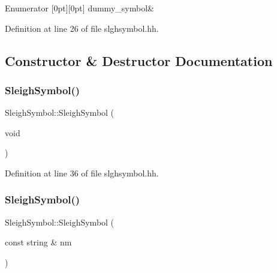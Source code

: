 \begin{DoxyEnumFields}{Enumerator}
[0pt][0pt]{}\mbox{\label{class_sleigh_symbol_aba70f7f332fd63488c5ec4bd7807db41acb07269e0bd99884c8507a618473896d}} 
dummy\+\_\+symbol&\\
\hline

\end{DoxyEnumFields}


Definition at line 26 of file slghsymbol.\+hh.



\subsection{Constructor \& Destructor Documentation}
\mbox{\label{class_sleigh_symbol_a15a720792ff4ad0940dd673c3215f037}} 
\subsubsection{\texorpdfstring{SleighSymbol()}{SleighSymbol()}\hspace{0.1cm}{\footnotesize\ttfamily [1/2]}}
{\footnotesize\ttfamily Sleigh\+Symbol\+::\+Sleigh\+Symbol (\begin{DoxyParamCaption}\item[{void}]{ }\end{DoxyParamCaption})\hspace{0.3cm}{\ttfamily [inline]}}



Definition at line 36 of file slghsymbol.\+hh.

\mbox{\label{class_sleigh_symbol_ad4f8681f0822c11b46633a7202ebd0e9}} 
\subsubsection{\texorpdfstring{SleighSymbol()}{SleighSymbol()}\hspace{0.1cm}{\footnotesize\ttfamily [2/2]}}
{\footnotesize\ttfamily Sleigh\+Symbol\+::\+Sleigh\+Symbol (\begin{DoxyParamCaption}\item[{const string \&}]{nm }\end{DoxyParamCaption})\hspace{0.3cm}{\ttfamily [inline]}}



